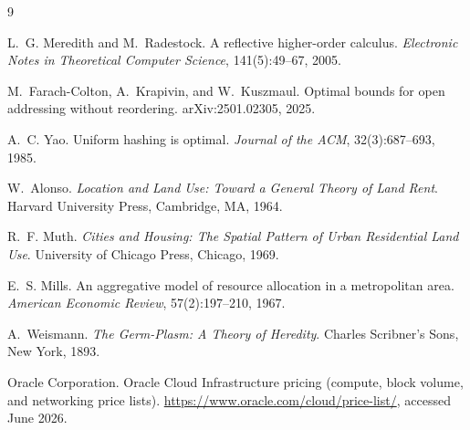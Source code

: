 \documentclass[11pt]{article}
\begin{document}
\begin{thebibliography}{9}

L.~G. Meredith and M.~Radestock.
\newblock A reflective higher-order calculus.
\newblock \emph{Electronic Notes in Theoretical Computer Science}, 141(5):49--67, 2005.

M.~Farach-Colton, A.~Krapivin, and W.~Kuszmaul.
\newblock Optimal bounds for open addressing without reordering.
\newblock arXiv:2501.02305, 2025.

A.~C. Yao.
\newblock Uniform hashing is optimal.
\newblock \emph{Journal of the ACM}, 32(3):687--693, 1985.

W.~Alonso.
\newblock \emph{Location and Land Use: Toward a General Theory of Land Rent}.
\newblock Harvard University Press, Cambridge, MA, 1964.

R.~F. Muth.
\newblock \emph{Cities and Housing: The Spatial Pattern of Urban Residential Land Use}.
\newblock University of Chicago Press, Chicago, 1969.

E.~S. Mills.
\newblock An aggregative model of resource allocation in a metropolitan area.
\newblock \emph{American Economic Review}, 57(2):197--210, 1967.

A.~Weismann.
\newblock \emph{The Germ-Plasm: A Theory of Heredity}.
\newblock Charles Scribner's Sons, New York, 1893.

Oracle Corporation.
\newblock Oracle Cloud Infrastructure pricing (compute, block volume, and networking price lists).
\newblock \url{https://www.oracle.com/cloud/price-list/}, accessed June 2026.

\end{thebibliography}
\end{document}
